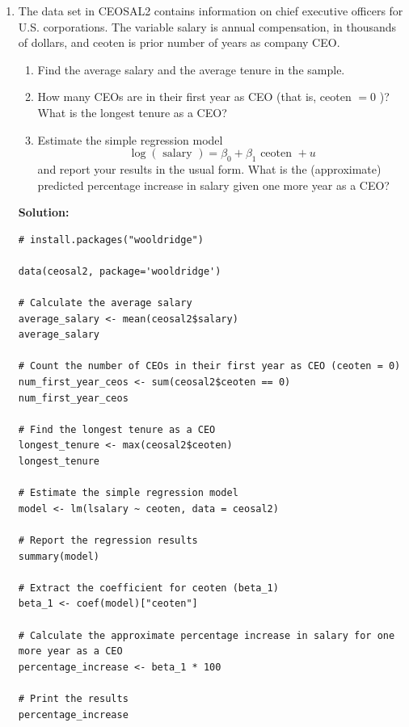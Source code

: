 \documentclass[12pt]{article}
\begin{document}
\begin{enumerate}

\item The data set in CEOSAL2 contains information on chief executive officers for U.S. corporations. The variable salary is annual compensation, in thousands of dollars, and ceoten is prior number of years as company CEO.
\begin{enumerate}
    
    \item Find the average salary and the average tenure in the sample.
    \item How many CEOs are in their first year as CEO (that is, ceoten $=0$ )? What is the longest tenure as a CEO?
    \item Estimate the simple regression model
$$
\log (\text { salary })=\beta_0+\beta_1 \text { ceoten }+u
$$
and report your results in the usual form. What is the (approximate) predicted percentage increase in salary given one more year as a CEO?
\end{enumerate}

{\color{blue}
\noindent \textbf{Solution:}

\begin{lstlisting}
# install.packages("wooldridge")

data(ceosal2, package='wooldridge')

# Calculate the average salary
average_salary <- mean(ceosal2$salary)
average_salary

# Count the number of CEOs in their first year as CEO (ceoten = 0)
num_first_year_ceos <- sum(ceosal2$ceoten == 0)
num_first_year_ceos

# Find the longest tenure as a CEO
longest_tenure <- max(ceosal2$ceoten)
longest_tenure

# Estimate the simple regression model
model <- lm(lsalary ~ ceoten, data = ceosal2)

# Report the regression results
summary(model)

# Extract the coefficient for ceoten (beta_1)
beta_1 <- coef(model)["ceoten"]

# Calculate the approximate percentage increase in salary for one more year as a CEO
percentage_increase <- beta_1 * 100

# Print the results
percentage_increase
\end{lstlisting}

}



\end{enumerate}
\end{document}
